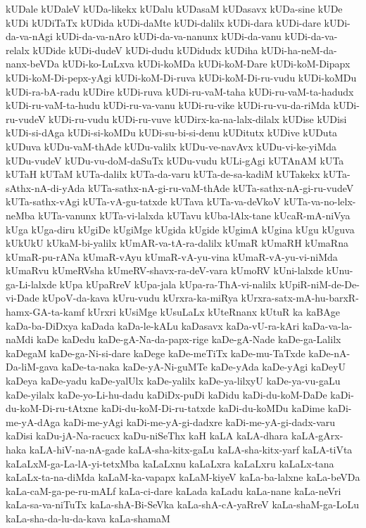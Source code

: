 {kUDale
kUDaleV
kUDa-likekx
kUDalu
kUDasaM
kUDasavx
kUDa-sine
kUDe
kUDi
kUDiTaTx
kUDida
kUDi-daMte
kUDi-dalilx
kUDi-dara
kUDi-dare
kUDi-da-va-nAgi
kUDi-da-va-nAro
kUDi-da-va-nanunx
kUDi-da-vanu
kUDi-da-va-relalx
kUDide
kUDi-dudeV
kUDi-dudu
kUDidudx
kUDiha
kUDi-ha-neM-da-nanx-beVDa
kUDi-ko-LuLxva
kUDi-koMDa
kUDi-koM-Dare
kUDi-koM-Dipapx
kUDi-koM-Di-pepx-yAgi
kUDi-koM-Di-ruva
kUDi-koM-Di-ru-vudu
kUDi-koMDu
kUDi-ra-bA-radu
kUDire
kUDi-ruva
kUDi-ru-vaM-taha
kUDi-ru-vaM-ta-hadudx
kUDi-ru-vaM-ta-hudu
kUDi-ru-va-vanu
kUDi-ru-vike
kUDi-ru-vu-da-riMda
kUDi-ru-vudeV
kUDi-ru-vudu
kUDi-ru-vuve
kUDirx-ka-na-lalx-dilalx
kUDise
kUDisi
kUDi-si-dAga
kUDi-si-koMDu
kUDi-su-bi-si-denu
kUDitutx
kUDive
kUDuta
kUDuva
kUDu-vaM-thAde
kUDu-valilx
kUDu-ve-navAvx
kUDu-vi-ke-yiMda
kUDu-vudeV
kUDu-vu-doM-daSuTx
kUDu-vudu
kULi-gAgi
kUTAnAM
kUTa
kUTaH
kUTaM
kUTa-dalilx
kUTa-da-varu
kUTa-de-sa-kadiM
kUTakekx
kUTa-sAthx-nA-di-yAda
kUTa-sathx-nA-gi-ru-vaM-thAde
kUTa-sathx-nA-gi-ru-vudeV
kUTa-sathx-vAgi
kUTa-vA-gu-tatxde
kUTava
kUTa-va-deVkoV
kUTa-va-no-lelx-neMba
kUTa-vanunx
kUTa-vi-lalxda
kUTavu
kUba-lAlx-tane
kUcaR-mA-niVya
kUga
kUga-diru
kUgiDe
kUgiMge
kUgida
kUgide
kUgimA
kUgina
kUgu
kUguva
kUkUkU
kUkaM-bi-yalilx
kUmAR-va-tA-ra-dalilx
kUmaR
kUmaRH
kUmaRna
kUmaR-pu-rANa
kUmaR-vAyu
kUmaR-vA-yu-vina
kUmaR-vA-yu-vi-niMda
kUmaRvu
kUmeRVsha
kUmeRV-shavx-ra-deV-vara
kUmoRV
kUni-lalxde
kUnu-ga-Li-lalxde
kUpa
kUpaRreV
kUpa-jala
kUpa-ra-ThA-vi-nalilx
kUpiR-niM-de-De-vi-Dade
kUpoV-da-kava
kUru-vudu
kUrxra-ka-miRya
kUrxra-satx-mA-hu-barxR-hamx-GA-ta-kamf
kUrxri
kUsiMge
kUsuLaLx
kUteRnanx
kUtuR
ka
kaBAge
kaDa-ba-DiDxya
kaDada
kaDa-le-kALu
kaDasavx
kaDa-vU-ra-kAri
kaDa-va-la-naMdi
kaDe
kaDedu
kaDe-gA-Na-da-papx-rige
kaDe-gA-Nade
kaDe-ga-Lalilx
kaDegaM
kaDe-ga-Ni-si-dare
kaDege
kaDe-meTiTx
kaDe-mu-TaTxde
kaDe-nA-Da-liM-gava
kaDe-ta-naka
kaDe-yA-Ni-guMTe
kaDe-yAda
kaDe-yAgi
kaDeyU
kaDeya
kaDe-yadu
kaDe-yalUlx
kaDe-yalilx
kaDe-ya-lilxyU
kaDe-ya-vu-gaLu
kaDe-yilalx
kaDe-yo-Li-hu-dadu
kaDiDx-puDi
kaDidu
kaDi-du-koM-DaDe
kaDi-du-koM-Di-ru-tAtxne
kaDi-du-koM-Di-ru-tatxde
kaDi-du-koMDu
kaDime
kaDi-me-yA-dAga
kaDi-me-yAgi
kaDi-me-yA-gi-dadxre
kaDi-me-yA-gi-dadx-varu
kaDisi
kaDu-jA-Na-racucx
kaDu-niSeThx
kaH
kaLA
kaLA-dhara
kaLA-gArx-haka
kaLA-hiV-na-nA-gade
kaLA-sha-kitx-gaLu
kaLA-sha-kitx-yarf
kaLA-tiVta
kaLaLxM-ga-La-lA-yi-tetxMba
kaLaLxnu
kaLaLxra
kaLaLxru
kaLaLx-tana
kaLaLx-ta-na-diMda
kaLaM-ka-vapapx
kaLaM-kiyeV
kaLa-ba-lalxne
kaLa-beVDa
kaLa-caM-ga-pe-ru-mALf
kaLa-ci-dare
kaLada
kaLadu
kaLa-nane
kaLa-neVri
kaLa-sa-va-niTuTx
kaLa-shA-Bi-SeVka
kaLa-shA-cA-yaRreV
kaLa-shaM-ga-LoLu
kaLa-sha-da-lu-da-kava
kaLa-shamaM
}
